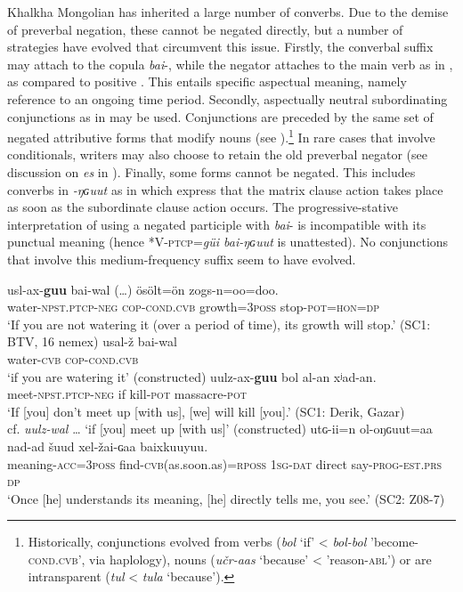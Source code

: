 \documentclass[output=paper,colorlinks,citecolor=brown,chinesefont]{langscibook}
\begin{document}
Khalkha Mongolian has inherited a large number of converbs. Due to the demise of preverbal negation, these cannot be negated directly, but a number of strategies have evolved that circumvent this issue. Firstly, the converbal suffix may attach to the copula \textit{bai}{}-, while the negator attaches to the main verb as in , as compared to positive . This entails specific aspectual meaning, namely reference to an ongoing time period. Secondly, aspectually neutral subordinating conjunctions as in  may be used. Conjunctions are preceded by the same set of negated attributive forms that modify nouns (see ).\footnote{Historically, conjunctions evolved from verbs (\textit{bol} ‘if’ < \textit{bol-bol} 'become-\textsc{cond.cvb}', via haplology), nouns (\textit{učr-aas} ‘because’ < 'reason-\textsc{abl}') or are intransparent (\textit{tul} < \textit{tula} ‘because’).}  In rare cases that involve conditionals, writers may also choose to retain the old preverbal negator (see discussion on \textit{es} in ). Finally, some forms cannot be negated. This includes converbs in \textit{-ŋɢuut} as in  which express that the matrix clause action takes place as soon as the subordinate clause action occurs. The progressive-stative interpretation of using a negated participle with \textit{bai}{}- is incompatible with its punctual meaning (hence *V-\textsc{ptcp}=\textit{güi bai-ŋɢuut} is unattested). No conjunctions that involve this medium-frequency suffix seem to have evolved. 

\ea\label{ex:kha:40}
    \ea\label{ex:kha:40a}
        \gll usl-ax-\textbf{guu} {bai-wal} (…) ösölt=ön zogs-n=oo=doo. \\ %
             water-\textsc{npst.ptcp-neg} \textsc{cop-cond.cvb} {} growth=\textsc{3poss} stop-\textsc{pot=hon=dp} \\
        \glt ‘If you are not watering it (over a period of time), its growth will stop.’ (SC1: BTV, 16 nemex)
    \ex\label{ex:kha:40b}
        \gll usal-ž bai-wal  \\ 
             water-\textsc{cvb} \textsc{cop-cond.cvb} \\
        \glt ‘if you are watering it’ (constructed)
    \z 
\z 
\ea\label{ex:kha:41}
    \gll uulz-ax-\textbf{guu} bol al-an xʲad-an. \\ 
         meet-\textsc{npst.ptcp-neg} if kill-\textsc{pot} massacre-\textsc{pot} \\
    \glt ‘If [you] don’t meet up [with us], [we] will kill [you].’ (SC1: Derik, Gazar) \\ cf. \textit{uulz-wal} … ‘if [you] meet up [with us]’ (constructed) 
\z 
\ea\label{ex:kha:42}
    \gll utɢ-ii=n ol-oŋɢuut=aa nad-ad šuud xel-žai-ɢaa baixkuuyuu.\\ 
         meaning-\textsc{acc=3poss} find-\textsc{cvb}(as.soon.as)=\textsc{rposs} \textsc{1sg-dat} direct {say-}\textsc{prog-est.prs} \textsc{dp} \\
    \glt ‘Once [he] understands its meaning, [he] directly tells me, you see.’ (SC2: Z08-7)
\z 
\end{document}
